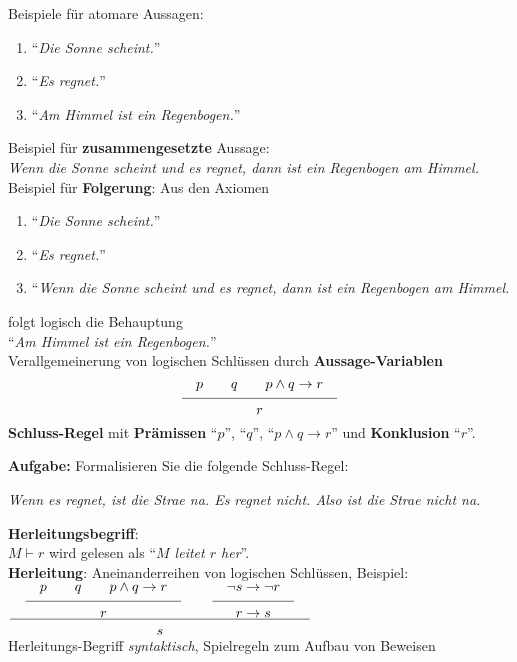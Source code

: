 \documentclass{article}
\newcommand{\schluss}[2]{\frac{\displaystyle\quad \rule[-6pt]{0pt}{12pt}#1 \quad}{\displaystyle\quad \rule{0pt}{10pt}#2 \quad}}
\begin{document}
Beispiele f\"{u}r atomare Aussagen:
\begin{enumerate}
\item ``{\em Die Sonne scheint.}''
\item ``{\em Es regnet.}''
\item ``{\em Am Himmel ist ein Regenbogen.}''
\end{enumerate}
Beispiel f\"{u}r \textbf{zusammengesetzte} Aussage:
\\[0.3cm]
\hspace*{0.3cm} {\em Wenn die Sonne scheint und es regnet, dann ist ein Regenbogen am Himmel.} 
\\[0.3cm]
Beispiel f\"{u}r \textbf{Folgerung}: Aus den Axiomen
\begin{enumerate}
\item ``{\em Die Sonne scheint.}''
\item ``{\em Es regnet.}'' 
\item ``{\em Wenn die Sonne scheint und es regnet, dann ist ein Regenbogen am Himmel.} 
\end{enumerate}
folgt logisch die Behauptung \\[0.3cm]
\hspace*{1.3cm} ``{\em Am Himmel ist ein Regenbogen.}'' 
\\[0.3cm]
Verallgemeinerung von logischen Schl\"{u}ssen durch \textbf{Aussage-Variablen}
$$ \schluss{p \quad\quad q \quad\quad p \wedge q \rightarrow r}{r} $$
\textbf{Schluss-Regel} mit \textbf{Pr\"{a}missen}  ``$p$'', ``$q$'', ``$p \wedge q \rightarrow r$''
und \textbf{Konklusion} ``$r$''.
\vspace*{0.3cm}

\noindent
\textbf{Aufgabe:} Formalisieren Sie die folgende Schluss-Regel:
\begin{center}
\begin{minipage}[c]{8.2cm}
{\em  Wenn es regnet, ist die Stra\3e na\3.  Es regnet nicht.  Also ist die Stra\3e nicht na\3.}
\end{minipage}  
\end{center}

\noindent
\textbf{Herleitungsbegriff}: 
\\[0.3cm]
\hspace*{1.3cm}
 $M \vdash r$ \qquad wird gelesen als \qquad ``\emph{$M$ leitet $r$ her}''.
\\[0.3cm]
\textbf{Herleitung}: Aneinanderreihen von logischen Schl\"{u}ssen, Beispiel: 
\\[0.3cm]
\hspace*{1.3cm}
$\displaystyle \schluss{\schluss{p \quad\quad q \quad\quad p \wedge q \rightarrow r}{r} \qquad
  \schluss{\neg s \rightarrow \neg r}{r \rightarrow s}}{s}$
\\[0.3cm]
Herleitungs-Begriff \emph{syntaktisch}, Spielregeln zum Aufbau von Beweisen
\vspace*{0.3cm}
\end{document}
